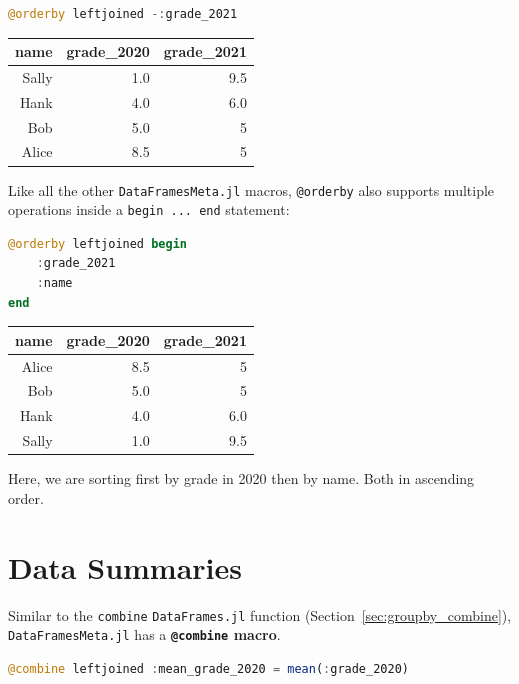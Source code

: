 \documentclass[
  notoc %
]{tufte-book}
\newcommand{\passthrough}[1]{#1}
\begin{document}
\begin{lstlisting}[language=Julia]
@orderby leftjoined -:grade_2021
\end{lstlisting}

\begin{longtable}[]{@{}rrr@{}}
\toprule()
name & grade\_2020 & grade\_2021 \\
\midrule()
\endhead
Sally & 1.0 & 9.5 \\
Hank & 4.0 & 6.0 \\
Bob & 5.0 & 5 \\
Alice & 8.5 & 5 \\
\bottomrule()
\end{longtable}

Like all the other \passthrough{\lstinline!DataFramesMeta.jl!} macros,
\passthrough{\lstinline!@orderby!} also supports multiple operations
inside a \passthrough{\lstinline!begin ... end!} statement:

\begin{lstlisting}[language=Julia]
@orderby leftjoined begin
    :grade_2021
    :name
end
\end{lstlisting}

\begin{longtable}[]{@{}rrr@{}}
\toprule()
name & grade\_2020 & grade\_2021 \\
\midrule()
\endhead
Alice & 8.5 & 5 \\
Bob & 5.0 & 5 \\
Hank & 4.0 & 6.0 \\
Sally & 1.0 & 9.5 \\
\bottomrule()
\end{longtable}

Here, we are sorting first by grade in 2020 then by name. Both in
ascending order.

\hypertarget{sec:dataframesmeta_combine}{%
\section{Data Summaries}\label{sec:dataframesmeta_combine}}

Similar to the \passthrough{\lstinline!combine!}
\passthrough{\lstinline!DataFrames.jl!} function
(Section~\ref{sec:groupby_combine}),
\passthrough{\lstinline!DataFramesMeta.jl!} has a
\textbf{\passthrough{\lstinline!@combine!} macro}.

\begin{lstlisting}[language=Julia]
@combine leftjoined :mean_grade_2020 = mean(:grade_2020)
\end{lstlisting}
\end{document}

